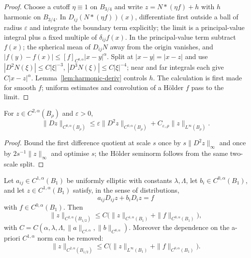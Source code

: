 \begin{proof}
Choose a cutoff $\eta\equiv1$ on $B_{3/4}$ and write
$z=N*(\eta f)+h$ with $h$ harmonic on $B_{3/4}$.  In
$D_{ij}(N*(\eta f))(x)$, differentiate first outside a ball of radius
$\varepsilon$ and integrate the boundary term explicitly; the limit is a
principal-value integral plus a fixed multiple of $\delta_{ij}f(x)$.  In the
principal-value term subtract $f(x)$; the spherical mean of $D_{ij}N$ away
from the origin vanishes, and
$|f(y)-f(x)|\le[f]_{C^{0,\alpha}}|x-y|^\alpha$.  Split at $|x-y|=|x-z|$ and
use $|D^2N(\xi)|\le C|\xi|^{-3}$, $|D^3N(\xi)|\le C|\xi|^{-4}$; near and far
integrals each give $C|x-z|^\alpha$.  Lemma~\ref{lem:harmonic-deriv} controls
$h$.  The calculation is first made for smooth $f$; uniform estimates and
convolution of a H\"older $f$ pass to the limit.
\end{proof}

\begin{lemma}\label{lem:holder-interp}
For $z\in C^{2,\alpha}(B_\rho)$ and $\varepsilon>0$,
\begin{equation}\label{eq:holder-interp}
  \|Dz\|_{C^{0,\alpha}(B_\rho)}
  \le\varepsilon\|D^2z\|_{C^{0,\alpha}(B_\rho)}
   +C_{\varepsilon,\rho}\|z\|_{L^\infty(B_\rho)} .
\end{equation}
\end{lemma}

\begin{proof}
Bound the first difference quotient at scale $s$ once by $s\|D^2z\|_\infty$
and once by $2s^{-1}\|z\|_\infty$ and optimise $s$; the H\"older seminorm
follows from the same two-scale split.
\end{proof}

\begin{theorem}\label{thm:nondiv-schauder}
Let $a_{ij}\in C^{1,\alpha}(B_1)$ be uniformly elliptic with constants
$\lambda,\Lambda$, let $b_i\in C^{0,\alpha}(B_1)$, and let
$z\in C^{1,\alpha}(B_1)$ satisfy, in the sense of distributions,
\[
  a_{ij}D_{ij}z+b_iD_iz=f
\]
with $f\in C^{0,\alpha}(B_1)$.  Then
\begin{equation}\label{eq:nondiv-schauder}
  \|z\|_{C^{2,\alpha}(B_{1/2})}
  \le C\bigl(\|z\|_{C^{1,\alpha}(B_1)}
              +\|f\|_{C^{0,\alpha}(B_1)}\bigr),
\end{equation}
with $C=C(\alpha,\lambda,\Lambda,\|a\|_{C^{1,\alpha}},
\|b\|_{C^{0,\alpha}})$.
Moreover the dependence on the a-priori $C^{1,\alpha}$ norm can be removed:
\begin{equation}\label{eq:nondiv-schauder-sharp}
  \|z\|_{C^{2,\alpha}(B_{1/2})}
  \le C\bigl(\|z\|_{L^\infty(B_1)}
              +\|f\|_{C^{0,\alpha}(B_1)}\bigr).
\end{equation}
\end{theorem}

